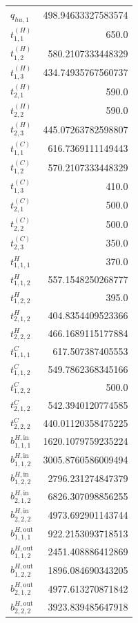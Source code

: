 \documentclass{article}%
\begin{document}
\begin{multicols*}{3}
\begin{supertabular}{lr}
	$q_{hu,1}$ & 498.94633327583574 \\%
	$t_{1,1}^{(H)}$ & 650.0 \\%
	$t_{1,2}^{(H)}$ & 580.2107333448329 \\%
	$t_{1,3}^{(H)}$ & 434.74935767560737 \\%
	$t_{2,1}^{(H)}$ & 590.0 \\%
	$t_{2,2}^{(H)}$ & 590.0 \\%
	$t_{2,3}^{(H)}$ & 445.07263782598807 \\%
	$t_{1,1}^{(C)}$ & 616.7369111149443 \\%
	$t_{1,2}^{(C)}$ & 570.2107333448329 \\%
	$t_{1,3}^{(C)}$ & 410.0 \\%
	$t_{2,1}^{(C)}$ & 500.0 \\%
	$t_{2,2}^{(C)}$ & 500.0 \\%
	$t_{2,3}^{(C)}$ & 350.0 \\%
	$t_{1,1,1}^{H}$ & 370.0 \\%
	$t_{1,1,2}^{H}$ & 557.1548250268777 \\%
	$t_{1,2,2}^{H}$ & 395.0 \\%
	$t_{2,1,2}^{H}$ & 404.8354409523366 \\%
	$t_{2,2,2}^{H}$ & 466.1689115177884 \\%
	$t_{1,1,1}^{C}$ & 617.507387405553 \\%
	$t_{1,1,2}^{C}$ & 549.7862368345166 \\%
	$t_{1,2,2}^{C}$ & 500.0 \\%
	$t_{2,1,2}^{C}$ & 542.3940120774585 \\%
	$t_{2,2,2}^{C}$ & 440.01120358475225 \\%
	$b_{1,1,1}^{H,\text{in}}$ & 1620.1079759235224 \\%
	$b_{1,1,2}^{H,\text{in}}$ & 3005.8760586009494 \\%
	$b_{1,2,2}^{H,\text{in}}$ & 2796.231274847379 \\%
	$b_{2,1,2}^{H,\text{in}}$ & 6826.307098856255 \\%
	$b_{2,2,2}^{H,\text{in}}$ & 4973.692901143744 \\%
	$b_{1,1,1}^{H,\text{out}}$ & 922.2153093718513 \\%
	$b_{1,1,2}^{H,\text{out}}$ & 2451.408886412869 \\%
	$b_{1,2,2}^{H,\text{out}}$ & 1896.084690343205 \\%
	$b_{2,1,2}^{H,\text{out}}$ & 4977.613270871842 \\%
	$b_{2,2,2}^{H,\text{out}}$ & 3923.839485647918 \\%

\end{supertabular}
\end{multicols*}
\end{document}
